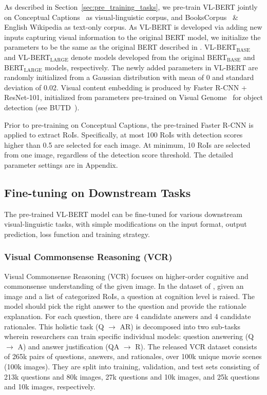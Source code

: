 As described in Section~\ref{sec:pre_training_tasks}, we pre-train VL-BERT jointly on Conceptual Captions~\citep{sharma2018conceptual} as visual-linguistic corpus, and BooksCorpus~\citep{zhu2015aligning} \& English Wikipedia as text-only corpus. As VL-BERT is developed via adding new inputs capturing visual information to the original BERT model, we initialize the parameters to be the same as the original BERT described in \citep{devlin2018bert}. VL-BERT$_\text{BASE}$ and VL-BERT$_\text{LARGE}$ denote models developed from the original BERT$_\text{BASE}$ and BERT$_\text{LARGE}$ models, respectively. The newly added parameters in VL-BERT are randomly initialized from a Gaussian distribution with mean of 0 and standard deviation of 0.02.  Visual content embedding is produced by Faster R-CNN + ResNet-101, initialized from parameters pre-trained on Visual Genome~\citep{krishna2017visual} for object detection (see BUTD~\citep{anderson2018bottom}).

Prior to pre-training on Conceptual Captions, the pre-trained Faster R-CNN is applied to extract RoIs. Specifically, at most 100 RoIs with detection scores higher than 0.5 are selected for each image. At minimum, 10 RoIs are selected from one image, regardless of the detection score threshold. The detailed parameter settings are in Appendix.

\subsection{Fine-tuning on Downstream Tasks}\label{sec:exp_finetune}

The pre-trained VL-BERT model can be fine-tuned for various downstream visual-linguistic tasks, with simple modifications on the input format, output prediction, loss function and training strategy.

\subsubsection{Visual Commonsense Reasoning (VCR)}

Visual Commonsense Reasoning (VCR) focuses on higher-order cognitive and commonsense understanding of the given image. In the dataset of \cite{zellers2019vcr}, given an image and a list of categorized RoIs, a question at cognition level is raised. The model should pick the right answer to the question and provide the rationale explanation. For each question, there are 4 candidate answers and 4 candidate rationales. This holistic task (Q $\rightarrow$ AR) is decomposed into two sub-tasks wherein researchers can train specific individual models: question answering (Q $\rightarrow$ A) and answer justification (QA $\rightarrow$ R). The released VCR dataset consists of 265k pairs of questions, answers, and rationales, over 100k unique movie scenes (100k images). They are split into training, validation, and test sets consisting of 213k questions and 80k images, 27k questions and 10k images, and 25k questions and 10k images, respectively.

